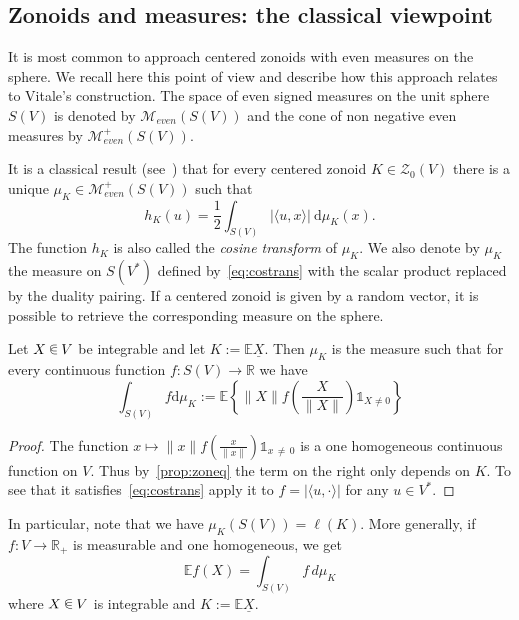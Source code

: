 \documentclass[10pt]{amsart}
\theoremstyle{definition}\newtheorem{defi}[theo]{Definition}\newtheorem{rema}[theo]{Remark}\newtheorem{exam}[theo]{Example}\newtheorem{exem}[theo]{Example}\newtheorem{nota}[theo]{Notation}
\newcommand{\R}{\mathbb{R}}
\newcommand{\EE}{\mathbb{E}}
\newcommand{\ZZo}{\mathscr{Z}_0}
\newcommand{\dd}{\mathrm{d}}
\newcommand{\Mev}{\mathcal{M}_{even}}
\newcommand{\one}{\mathds{1}}
\newcommand{\seg}{\underline}
\newcommand*\randin{
\mathchoice {\raisebox{-.35ex}{$\displaystyle{^\subset}$}\mkern-11.5mu\raisebox{+.45ex}{$\displaystyle{_\subset}$}} {\mkern+1mu\raisebox{-.27ex}{$\textstyle{^\subset}$}\mkern-11.7mu\raisebox{+.45ex}{$\textstyle{_\subset}$}} {\raisebox{.35ex}{$\scriptstyle\subset$}\mkern-14mu\raisebox{-.15ex}{$\scriptstyle\subset$}} {\raisebox{.3ex}{$\scriptscriptstyle\subset$}\mkern-13.5mu\raisebox{-.10ex}{$\scriptscriptstyle\subset$}}}
\begin{document}
\subsection{Zonoids and measures: the classical viewpoint}\label{sec:zonandmeas}

It is most common to approach centered zonoids with even measures on the sphere. We recall here this point of view and describe how this approach relates to Vitale's construction. The space of even signed measures on the unit sphere $S(V)$ is denoted by $\Mev(S(V))$ and the cone of non negative even measures by $\Mev^+(S(V))$.

It is a classical result (see~\cite[Theorem~3.5.3]{bible}) that for every centered zonoid $K\in\ZZo(V)$ there is a unique $\mu_K\in\Mev^+(S(V))$ such that
\begin{equation}\label{eq:costrans}
h_K(u)=\frac{1}{2}\int_{S(V)}|\langle u, x \rangle| \ \dd\mu_K(x).
\end{equation}
The function $h_K$ is also called the \emph{cosine transform} of $\mu_K$. We also denote by $\mu_K$ the measure on $S(V^*)$ defined by~\eqref{eq:costrans} with the scalar product replaced by the duality pairing. If a centered zonoid is given by a random vector, it is possible to retrieve the corresponding measure on the sphere.

\begin{prop}\label{prop:fromrvtomeas}
Let $X\,\randin\, V$ be integrable and let $K:=\EE\seg{X}$. Then $\mu_K$ is the measure such that for every continuous function $f:S(V)\to\R$ we have
\begin{equation}\label{eq:forMUla}
\int_{S(V)}f \dd\mu_K:=\EE\left\{\|X\|f\left(\frac{X}{\|X\|}\right)\one_{X\neq 0}\right\}
\end{equation}
\end{prop}

\begin{proof}
The function $x\mapsto\|x\|f(\frac{x}{\|x\|})\one_{x\,\neq\,0}$ is a one homogeneous continuous function on $V$. Thus by~\cref{prop:zoneq} the term on the right only depends on $K$. To see that it satisfies~\eqref{eq:costrans} apply it to $f=|\langle u, \cdot\rangle|$ for any $u\in V^*$.
\end{proof}

In particular, note that we have $\mu_K(S(V))=\ell(K)$. More generally, if $f:V\to\R_+$ is measurable and one homogeneous, we get
\begin{equation}\label{eq:intwrtgenmeas}
\EE f(X)=\int_{S(V)}f\, d\mu_K
\end{equation}
where $X\,\randin\, V$ is integrable and $K:=\EE\seg{X}$.
\end{document}
